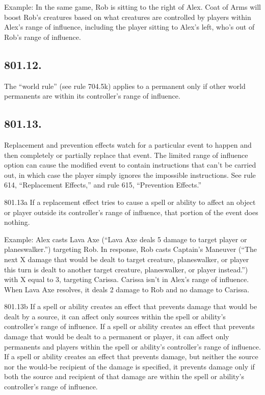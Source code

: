 Example: In the same game, Rob is sitting to the right of Alex. Coat of Arms will boost Rob’s creatures based on what creatures are controlled by players within Alex’s range of influence, including the player sitting to Alex’s left, who’s out of Rob’s range of influence.

\subsection*{801.12.}
The “world rule” (see rule 704.5k) applies to a permanent only if other world permanents are within its controller’s range of influence.

\subsection*{801.13.}
Replacement and prevention effects watch for a particular event to happen and then completely or partially replace that event. The limited range of influence option can cause the modified event to contain instructions that can’t be carried out, in which case the player simply ignores the impossible instructions. See rule 614, “Replacement Effects,” and rule 615, “Prevention Effects.”

801.13a If a replacement effect tries to cause a spell or ability to affect an object or player outside its controller’s range of influence, that portion of the event does nothing.

Example: Alex casts Lava Axe (“Lava Axe deals 5 damage to target player or planeswalker.”) targeting Rob. In response, Rob casts Captain’s Maneuver (“The next X damage that would be dealt to target creature, planeswalker, or player this turn is dealt to another target creature, planeswalker, or player instead.”) with X equal to 3, targeting Carissa. Carissa isn’t in Alex’s range of influence. When Lava Axe resolves, it deals 2 damage to Rob and no damage to Carissa.

801.13b If a spell or ability creates an effect that prevents damage that would be dealt by a source, it can affect only sources within the spell or ability’s controller’s range of influence. If a spell or ability creates an effect that prevents damage that would be dealt to a permanent or player, it can affect only permanents and players within the spell or ability’s controller’s range of influence. If a spell or ability creates an effect that prevents damage, but neither the source nor the would-be recipient of the damage is specified, it prevents damage only if both the source and recipient of that damage are within the spell or ability’s controller’s range of influence.

